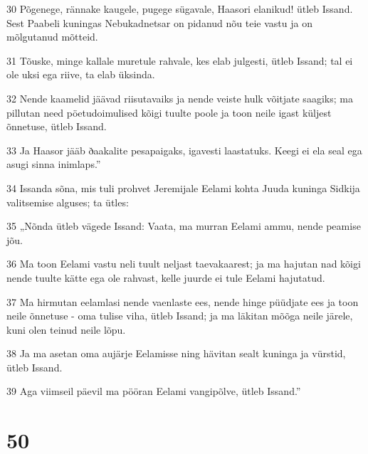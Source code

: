 \par 30 Põgenege, rännake kaugele, pugege sügavale, Haasori elanikud! ütleb Issand. Sest Paabeli kuningas Nebukadnetsar on pidanud nõu teie vastu ja on mõlgutanud mõtteid.
\par 31 Tõuske, minge kallale muretule rahvale, kes elab julgesti, ütleb Issand; tal ei ole uksi ega riive, ta elab üksinda.
\par 32 Nende kaamelid jäävad riisutavaiks ja nende veiste hulk võitjate saagiks; ma pillutan need pöetudoimulised kõigi tuulte poole ja toon neile igast küljest õnnetuse, ütleb Issand.
\par 33 Ja Haasor jääb ðaakalite pesapaigaks, igavesti laastatuks. Keegi ei ela seal ega asugi sinna inimlaps.”
\par 34 Issanda sõna, mis tuli prohvet Jeremijale Eelami kohta Juuda kuninga Sidkija valitsemise alguses; ta ütles:
\par 35 „Nõnda ütleb vägede Issand: Vaata, ma murran Eelami ammu, nende peamise jõu.
\par 36 Ma toon Eelami vastu neli tuult neljast taevakaarest; ja ma hajutan nad kõigi nende tuulte kätte ega ole rahvast, kelle juurde ei tule Eelami hajutatud.
\par 37 Ma hirmutan eelamlasi nende vaenlaste ees, nende hinge püüdjate ees ja toon neile õnnetuse - oma tulise viha, ütleb Issand; ja ma läkitan mõõga neile järele, kuni olen teinud neile lõpu.
\par 38 Ja ma asetan oma aujärje Eelamisse ning hävitan sealt kuninga ja vürstid, ütleb Issand.
\par 39 Aga viimseil päevil ma pööran Eelami vangipõlve, ütleb Issand.”

\chapter{50}

